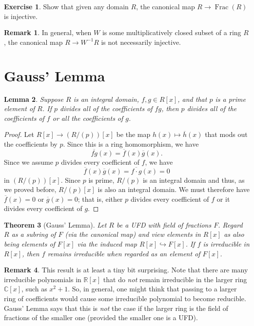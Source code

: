 \documentclass[12pt]{report}
\newtheorem{theorem}{Theorem}[chapter]
\newtheorem{lemma}[theorem]{Lemma}
\numberwithin{equation}{section}
\numberwithin{theorem}{chapter}
\theoremstyle{definition}
\newtheorem{exercise}{Exercise}
\newtheorem*{basic properties}{Basic Properties}
\newtheorem*{Important Remark}{Important Remark}
\newtheorem{remark}[theorem]{Remark}
\newcommand{\R}{\mathbb{R}}
\newcommand{\C}{\mathbb{C}}
\DeclareMathOperator{\Frac}{Frac}
\begin{document}
\begin{exercise}
Show that given any domain $R$, the canonical map $R \to \Frac(R)$ is injective.
\end{exercise}

\begin{remark}
	In general, when $W$ is some multiplicatively closed subset of a ring $R$, the canonical map $R \longrightarrow W^{-1}R$ is not necessarily injective.
\end{remark}


\section{Gauss' Lemma}


\begin{lemma}\label{lemma to prove Gauss}
Suppose $R$ is an integral domain, $f, g \in R[x]$, and that $p$ is a prime element of $R$. If $p$ divides all of the coefficients of $fg$, then $p$ divides all of the coefficients of $f$ or all the coefficients of $g$.
\end{lemma}


\begin{proof} 
Let $R[x] \to (R/(p))[x]$ be the map $h(x) \mapsto \overline{h}(x)$ that mods out the coefficients by $p$. 
Since this is a ring homomorphism, we have 
$$\overline{f g}(x) = \overline{f}(x) \overline{g}(x).$$ 
Since we assume $p$ divides every coefficient of $f$, we have
$$\overline{f}(x) \overline{g}(x)= \overline{f \cdot g}(x) =  0$$
in $(R/(p))[x]$. Since $p$ is prime, $R/(p)$ is an integral domain and thus, as we proved before, $R/(p)[x]$ is also an integral domain.
We must therefore have $\overline{f}(x) = 0$ or $\overline{g}(x) = 0$; that is, either $p$ divides every coefficient of $f$ or it divides every coefficient of $g$.
\end{proof}



\begin{theorem}[Gauss' Lemma]\label{Gauss Lemma}\label{Gauss Lemma}
Let $R$ be a UFD with field of fractions $F$. Regard $R$ as a subring of $F$ (via the canonical map) and view elements in $R[x]$ as also being elements of $F[x]$ via the induced map $R[x]\hookrightarrow F[x]$.
If $f$ is irreducible in $R[x]$, then $f$ remains irreducible when regarded as an element of $F[x]$.
\end{theorem}


\begin{remark}
This result is at least a tiny bit surprising. Note that there are many irreducible polynomials in $\R[x]$  that do {\em not} remain irreducible in the larger ring $\C[x]$, such as $x^2 + 1$. So, in general, one might think that passing to a larger ring of coefficients would cause some irreducible polynomial to become reducible. Gauss' Lemma says that this is {\em not} the case if the larger ring is the field of fractions of the smaller one (provided the smaller one is a UFD). 
\end{remark}
\end{document}
